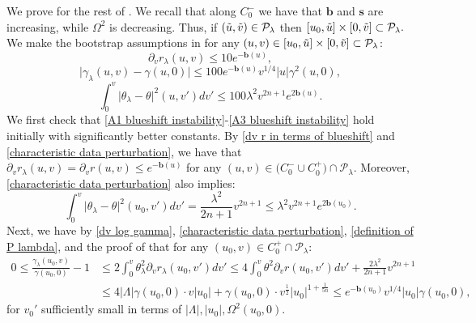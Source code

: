 \documentclass[11pt]{article}
\numberwithin{equation}{section}
\begin{document}
We prove  for the rest of . We recall that along $C_0^-$ we have that $\mathbf{b}$ and $\mathbf{s}$ are increasing, while $\Omega^2$ is decreasing. Thus, if $(\Tilde{u},\Tilde{v})\in\mathcal{P}_{\lambda}$ then $[u_0,\Tilde{u}]\times[0,\Tilde{v}]\subset\mathcal{P}_{\lambda}.$ We make the bootstrap assumptions in for any $(u,v)\in[u_0,\Tilde{u}]\times[0,\Tilde{v}]\subset\mathcal{P}_{\lambda}$:
\begin{equation}\label{A1 blueshift instability}
    \partial_vr_{\lambda}(u,v)\leq 10e^{-\mathbf{b}(u)},
\end{equation}
\begin{equation}\label{A2 blueshift instability}
    \big|\gamma_{\lambda}(u,v)-\gamma(u,0)\big|\leq 100e^{-\mathbf{b}(u)}v^{1/4}|u|\gamma^2(u,0),
\end{equation}
\begin{equation}\label{A3 blueshift instability}
    \int_0^v\big|\theta_{\lambda}-\theta\big|^2(u,v')dv'\leq 100\lambda^2v^{2n+1}e^{2\mathbf{b}(u)}.
\end{equation}
We first check that \eqref{A1 blueshift instability}-\eqref{A3 blueshift instability} hold initially with significantly better constants. By \eqref{dv r in terms of blueshift} and \eqref{characteristic data perturbation}, we have that $\partial_vr_{\lambda}(u,v)=\partial_vr(u,v)\leq e^{-\mathbf{b}(u)}$ for any $(u,v)\in \big(C_0^-\cup C_0^+\big)\cap\mathcal{P}_{\lambda}.$ Moreover, \eqref{characteristic data perturbation} also implies:
\begin{equation}\label{bound for theta initial data pert}
    \int_0^v\big|\theta_{\lambda}-\theta\big|^2(u_0,v')dv'=\frac{\lambda^2}{2n+1}v^{2n+1}\leq\lambda^2v^{2n+1}e^{2\mathbf{b}(u_0)}.
\end{equation}
Next, we have by \eqref{dv log gamma}, \eqref{characteristic data perturbation}, \eqref{definition of P lambda}, and the proof of  that for any $(u_0,v)\in C_0^+\cap\mathcal{P}_{\lambda}:$
\begin{align*}
    0\leq\frac{\gamma_{\lambda}(u_0,v)}{\gamma(u_0,0)}-1&\leq2\int_0^v\theta^2_{\lambda}\partial_vr_{\lambda}(u_0,v')dv'\leq4\int_0^v\theta^2\partial_vr(u_0,v')dv'+\frac{2\lambda^2}{2n+1}v^{2n+1}\\
    &\leq4|\Lambda|\gamma(u_0,0)\cdot v|u_0|+\gamma(u_0,0)\cdot v^{\frac{1}{2}}|u_0|^{1+\frac{1}{5n}}\leq e^{-\mathbf{b}(u_0)}v^{1/4}|u_0|\gamma(u_0,0),
\end{align*}
for $v_0'$ sufficiently small in terms of $|\Lambda|,|u_0|,\Omega^2(u_0,0).$
\end{document}
